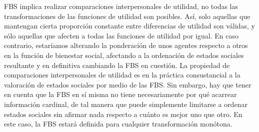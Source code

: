 \documentclass{nuevotema}
\begin{document}
FBS implica realizar comparaciones interpersonales de utilidad, no todas las transformaciones de las funciones de utilidad son posibles. Así, solo aquellas que mantengan cierta proporción constante entre diferencias de utilidad son válidas, y sólo aquellas que afecten a todas las funciones de utilidad por igual. En caso contrario, estaríamos alterando la ponderación de unos agentes respecto a otros en la función de bienestar social, afectando a la ordenación de estados sociales resultante y en definitiva cambiando la FBS en cuestión. La propiedad de comparaciones interpersonales de utilidad es en la práctica consustancial a la valoración de estados sociales por medio de las FBS. Sin embargo, hay que tener en cuenta que la FBS en sí misma no tiene necesariamente por qué acarrear información cardinal, de tal manera que puede simplemente limitarse a ordenar estados sociales sin afirmar nada respecto a cuánto es mejor uno que otro. En este caso, la FBS estará definida para cualquier transformación monótona.
\end{document}
